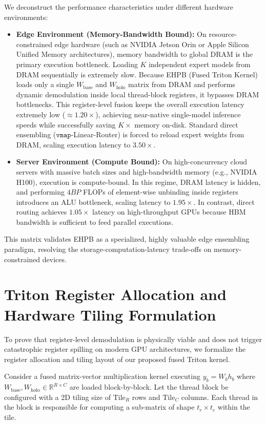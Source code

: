 \documentclass{article}
\theoremstyle{plain}
\theoremstyle{definition}
\theoremstyle{remark}
\begin{document}
We deconstruct the performance characteristics under different hardware environments:
\begin{itemize}
\item \textbf{Edge Environment (Memory-Bandwidth Bound):} On resource-constrained edge hardware (such as NVIDIA Jetson Orin or Apple Silicon Unified Memory architectures), memory bandwidth to global DRAM is the primary execution bottleneck. Loading $K$ independent expert models from DRAM sequentially is extremely slow. Because EHPB (Fused Triton Kernel) loads only a single $W_{\text{base}}$ and $W_{\text{holo}}$ matrix from DRAM and performs dynamic demodulation inside local thread-block registers, it bypasses DRAM bottlenecks. This register-level fusion keeps the overall execution latency extremely low ($\approx 1.20\times$), achieving near-native single-model inference speeds while successfully saving $K\times$ memory on-disk. Standard direct ensembling ($\mathtt{vmap}$-Linear-Router) is forced to reload expert weights from DRAM, scaling execution latency to $3.50\times$.
\item \textbf{Server Environment (Compute Bound):} On high-concurrency cloud servers with massive batch sizes and high-bandwidth memory (e.g., NVIDIA H100), execution is compute-bound. In this regime, DRAM latency is hidden, and performing $4BP$ FLOPs of element-wise unbinding inside registers introduces an ALU bottleneck, scaling latency to $1.95\times$. In contrast, direct routing achieves $1.05\times$ latency on high-throughput GPUs because HBM bandwidth is sufficient to feed parallel executions.
\end{itemize}
This matrix validates EHPB as a specialized, highly valuable edge ensembling paradigm, resolving the storage-computation-latency trade-offs on memory-constrained devices.

\section{Triton Register Allocation and Hardware Tiling Formulation}
\label{app:triton_formulation}

To prove that register-level demodulation is physically viable and does not trigger catastrophic register spilling on modern GPU architectures, we formalize the register allocation and tiling layout of our proposed fused Triton kernel.

Consider a fused matrix-vector multiplication kernel executing $y_b = W_b h_b$ where $W_{\text{base}}, W_{\text{holo}} \in \mathbb{R}^{R \times C}$ are loaded block-by-block. Let the thread block be configured with a 2D tiling size of $\text{Tile}_R$ rows and $\text{Tile}_C$ columns. Each thread in the block is responsible for computing a sub-matrix of shape $t_r \times t_c$ within the tile. 
\end{document}
